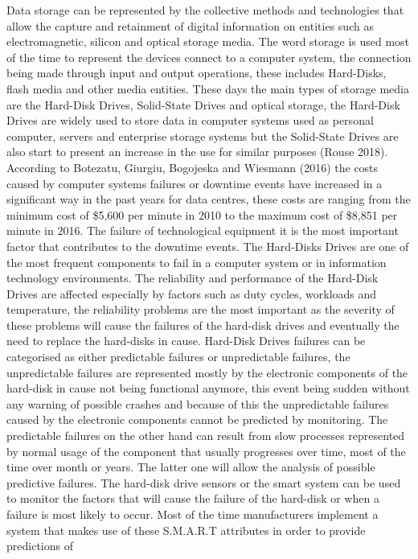 Data storage can be represented by the collective methods and technologies that allow the capture and retainment
of digital information on entities such as electromagnetic, silicon and optical storage media. The word storage
is used most of the time to represent the devices connect to a computer system, the connection being made through
input and output operations, these includes Hard-Disks, flash media and other media entities. These days the main
types of storage media are the Hard-Disk Drives, Solid-State Drives and optical storage, the Hard-Disk
Drives are widely used to store data in computer systems used as personal computer, servers and enterprise storage
systems but the Solid-State Drives are also start to present an increase in the use for similar purposes (Rouse 2018).
According to Botezatu, Giurgiu, Bogojeska and Wiesmann (2016) the costs caused by computer systems failures or
downtime events have increased in a significant way in the past years for data centres, these costs are ranging
from the minimum cost of \$5,600 per minute in 2010 to the maximum cost of \$8,851 per minute in 2016. The failure
of technological equipment it is the most important factor that contributes to the downtime events. The Hard-Disks
Drives are one of the most frequent components to fail in a computer system or in information technology environments.
The reliability and performance of the Hard-Disk Drives are affected especially by factors such as duty cycles,
workloads and temperature, the reliability problems are the most important as the severity of these problems will
cause the failures of the hard-disk drives and eventually the need to replace the hard-disks in cause. Hard-Disk
Drives failures can be categorised as either predictable failures or unpredictable failures, the unpredictable
failures are represented mostly by the electronic components of the hard-disk in cause not being functional anymore,
this event being sudden without any warning of possible crashes and because of this the unpredictable failures
caused by the electronic components cannot be predicted by monitoring. The predictable failures on the other hand can
result from slow processes represented by normal usage of the component that usually progresses over time, most of
the time over month or years. The latter one will allow the analysis of possible predictive failures. The hard-disk
drive sensors or the \acrfull{smart} system can be used to monitor the
factors that will cause the failure of the hard-disk or when a failure is most likely to occur. Most of the time
manufacturers implement a system that makes use of these S.M.A.R.T attributes in order to provide predictions of
